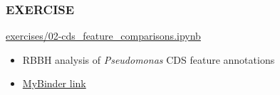 \begin{frame}
  \frametitle{EXERCISE}
  \begin{alertblock}{\url{exercises/02-cds_feature_comparisons.ipynb}}
    \begin{itemize}
      \item RBBH analysis of \textit{Pseudomonas} CDS feature annotations
    \end{itemize}
  \end{alertblock}
  \begin{itemize}
    \item \textcolor{hutton_purple}{\href{http://mybinder.org/repo/widdowquinn/Teaching-EMBL-Plant-Path-Genomics}{MyBinder link}}
  \end{itemize}
\end{frame}


